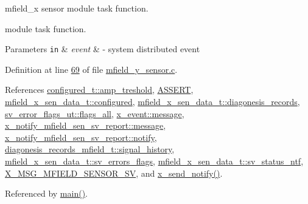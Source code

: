 mfield\+\_\+x sensor module task function. 

module task function.


\begin{DoxyParams}[1]{Parameters}
\mbox{\tt in}  & {\em event} & -\/ system distributed event \\
\hline
\end{DoxyParams}


Definition at line \hyperlink{a00052_source_l00069}{69} of file \hyperlink{a00052_source}{mfield\+\_\+y\+\_\+sensor.\+c}.



References \hyperlink{a00021_a4b3bbfb0267daea1432f2603825ade62}{configured\+\_\+t\+::amp\+\_\+treshold}, \hyperlink{a00072_source_l00059}{A\+S\+S\+E\+R\+T}, \hyperlink{a00025_source_l00036}{mfield\+\_\+x\+\_\+sen\+\_\+data\+\_\+t\+::configured}, \hyperlink{a00025_source_l00048}{mfield\+\_\+x\+\_\+sen\+\_\+data\+\_\+t\+::diagonesis\+\_\+records}, \hyperlink{a00022_source_l00044}{sv\+\_\+error\+\_\+flags\+\_\+ut\+::flags\+\_\+all}, \hyperlink{a00036_source_l00064}{x\+\_\+event\+::message}, \hyperlink{a00019_a946af134546e64739ccfd37633480dc2}{x\+\_\+notify\+\_\+mfield\+\_\+sen\+\_\+sv\+\_\+report\+::message}, \hyperlink{a00019_source_l00090}{x\+\_\+notify\+\_\+mfield\+\_\+sen\+\_\+sv\+\_\+report\+::notify}, \hyperlink{a00019_ab7038f4de1f77b52a7f89e9f77c0b846}{diagonesis\+\_\+records\+\_\+mfield\+\_\+t\+::signal\+\_\+history}, \hyperlink{a00025_source_l00051}{mfield\+\_\+x\+\_\+sen\+\_\+data\+\_\+t\+::sv\+\_\+errors\+\_\+flags}, \hyperlink{a00025_source_l00026}{mfield\+\_\+x\+\_\+sen\+\_\+data\+\_\+t\+::sv\+\_\+status\+\_\+ntf}, \hyperlink{a00025_source_l00012}{X\+\_\+\+M\+S\+G\+\_\+\+M\+F\+I\+E\+L\+D\+\_\+\+S\+E\+N\+S\+O\+R\+\_\+\+S\+V}, and \hyperlink{a00037_source_l00435}{x\+\_\+send\+\_\+notify()}.



Referenced by \hyperlink{a00048_source_l00080}{main()}.


